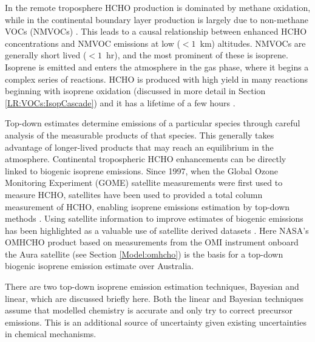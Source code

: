     In the remote troposphere HCHO production is dominated by methane oxidation, while in the continental boundary layer production is largely due to non-methane VOCs (NMVOCs) \parencite{Abbot2003, Kefauver2014}.
    This leads to a causal relationship between enhanced HCHO concentrations and NMVOC emissions at low ($<1$~km) altitudes.
    NMVOCs are generally short lived ($<1$~hr), and the most prominent of these is isoprene.
    Isoprene is emitted and enters the atmosphere in the gas phase, where it begins a complex series of reactions.
    HCHO is produced with high yield in many reactions beginning with isoprene oxidation (discussed in more detail in Section \ref{LR:VOCs:IsopCascade}) and it has a lifetime of a few hours \parencite{Kefauver2014}.
    
    Top-down estimates determine emissions of a particular species through careful analysis of the measurable products of that species.
    This generally takes advantage of longer-lived products that may reach an equilibrium in the atmosphere.
    Continental tropospheric HCHO enhancements can be directly linked to biogenic isoprene emissions.
    Since 1997, when the Global Ozone Monitoring Experiment (GOME) satellite measurements were first used to measure HCHO, satellites have been used to provided a total column measurement of HCHO, enabling isoprene emissions estimation by top-down methods \parencite{Thomas1998,Palmer2001,Bauwens2016}.
    Using satellite information to improve estimates of biogenic emissions has been highlighted as a valuable use of satellite derived datasets \parencite{Streets2013}.
    Here NASA's OMHCHO product based on measurements from the OMI instrument onboard the Aura satellite (see Section \ref{Model:omhcho}) is the basis for a top-down biogenic isoprene emission estimate over Australia.
    
    There are two top-down isoprene emission estimation techniques, Bayesian and linear, which are discussed briefly here.
    Both the linear and Bayesian techniques assume that modelled chemistry is accurate and only try to correct precursor emissions.
    This is an additional source of uncertainty given existing uncertainties in chemical mechanisms.
    
